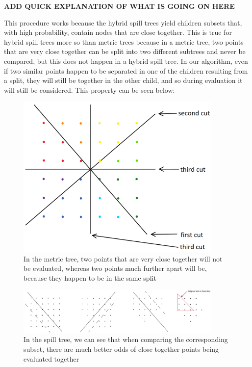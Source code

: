 \vspace{5 mm}
\noindent
\textbf{ADD QUICK EXPLANATION OF WHAT IS GOING ON HERE} 

\vspace{5 mm}
\noindent
This procedure works because the hybrid spill trees yield children subsets that,
with high probability, contain nodes that are close together.  This is true for 
hybrid spill trees more so than metric trees because in a metric tree, two points
that are very close together can be split into two different subtrees and never be
compared, but this does not happen in a hybrid spill tree.  In our algorithm, even
if two similar points happen to be separated in one of the children resulting from
a split, they will still be together in the other child, and so during evaluation 
it will still be considered.  This property can be seen below:

\vspace{5 mm}
\noindent
\hrulefill
\begin{figure}[h]
\centering
\includegraphics[width=0.9\textwidth]{metric}
\caption{In the metric tree, two points that are very close together will not 
be evaluated, whereas two points much further apart will be, because they 
happen to be in the same split}
\end{figure}
\hrulefill

\vspace{5 mm}
\noindent
\hrulefill
\begin{figure}[h]
\centering
\includegraphics[width=0.9\textwidth]{spill}
\caption{In the spill tree, we can see that when comparing the corresponding
subset, there are much better odds of close together points being evaluated
together}
\end{figure}
\hrulefill

